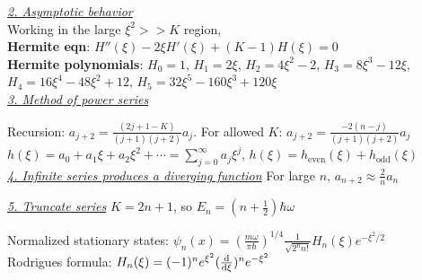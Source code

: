 \textit{\underline{2. Asymptotic behavior}} \\

Working in the large $\xi^2 >> K$ region, \\
\textbf{Hermite eqn}: $H''(\xi) - 2 \xi H'(\xi) + (K - 1) H(\xi) = 0$ \\

\textbf{Hermite polynomials}: $H_0 = 1$, $H_1 = 2 \xi$, $H_2 = 4 \xi^2 - 2$, $H_3 = 8 \xi^3 - 12 \xi$, $H_4 = 16 \xi^4 - 48 \xi^2 + 12$, $H_5 = 32 \xi^5 - 160 \xi^3 + 120 \xi$ \\

\textit{\underline{3. Method of power series}}


Recursion: $a_{j+2} = \frac{(2j + 1 - K)}{(j + 1)(j + 2)} a_j$. For allowed $K$: $a_{j+2} = \frac{-2(n - j)}{(j+1)(j+2)} a_j$ \\

$h(\xi) = a_0 + a_1 \xi + a_2 \xi^2 + \cdots = \sum_{j=0}^{\infty} a_j \xi^j$,
$h(\xi) = h_{\text{even}}(\xi) + h_{\text{odd}}(\xi)$ \\




\textit{\underline{4. Infinite series produces a diverging function}}
For large $n$, $a_{n+2} \approx \frac{2}{n} a_n$ 

\textit{\underline{5. Truncate series}} $K = 2n + 1$, so $E_n = (n + \frac{1}{2}) \hbar \omega$

Normalized stationary states:
$\psi_n(x) = (\frac{m \omega}{\pi \hbar})^{1/4} \frac{1}{\sqrt{2^n n!}} H_n(\xi) e^{-\xi^2 / 2}$ \\

Rodrigues formula: $H_n(\xi) = (-1)^n e^{\xi^2} (\dv{}{\xi})^n e^{-\xi^2}$



